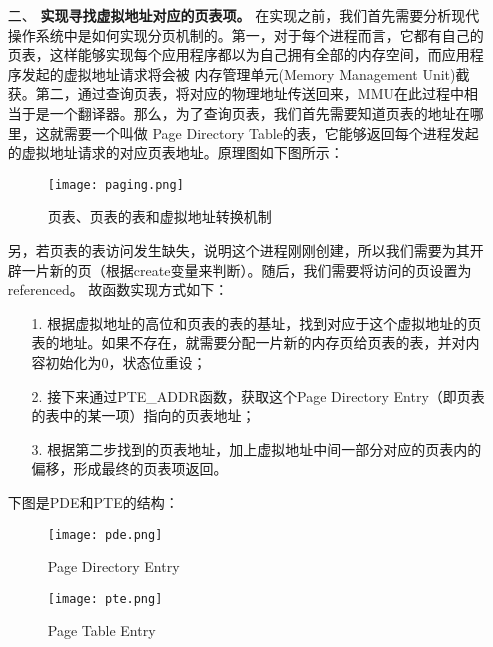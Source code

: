 \documentclass[UTF8, a4paper]{ctexart}
\begin{document}
\begin{enumerate}
    \item [二、] \textbf{实现寻找虚拟地址对应的页表项。}
    在实现之前，我们首先需要分析现代操作系统中是如何实现分页机制的。第一，对于每个进程而言，它都有自己的页表，这样能够实现每个应用程序都以为自己拥有全部的内存空间，而应用程序发起的虚拟地址请求将会被
    内存管理单元(Memory Management Unit)截获。第二，通过查询页表，将对应的物理地址传送回来，MMU在此过程中相当于是一个翻译器。那么，为了查询页表，我们首先需要知道页表的地址在哪里，这就需要一个叫做
    Page Directory Table的表，它能够返回每个进程发起的虚拟地址请求的对应页表地址。原理图如下图所示：
    \begin{figure}[!htb]
        \centering
        \texttt{[image: paging.png]}
        \label{fig:1}
        \caption{页表、页表的表和虚拟地址转换机制}
    \end{figure}
    \par
    另，若页表的表访问发生缺失，说明这个进程刚刚创建，所以我们需要为其开辟一片新的页（根据create变量来判断）。随后，我们需要将访问的页设置为referenced。
    故函数实现方式如下：
    \begin{enumerate}
        \item [1.] 根据虚拟地址的高位和页表的表的基址，找到对应于这个虚拟地址的页表的地址。如果不存在，就需要分配一片新的内存页给页表的表，并对内容初始化为0，状态位重设；
        \item [2.] 接下来通过PTE\_ADDR函数，获取这个Page Directory Entry（即页表的表中的某一项）指向的页表地址；
        \item [3.] 根据第二步找到的页表地址，加上虚拟地址中间一部分对应的页表内的偏移，形成最终的页表项返回。
    \end{enumerate}
    \par
    下图是PDE和PTE的结构：
    \begin{figure}[!htb]
        \centering
        \texttt{[image: pde.png]}
        \label{fig:1}
        \caption{Page Directory Entry}
    \end{figure}
    \begin{figure}[!htb]
        \centering
        \texttt{[image: pte.png]}
        \label{fig:1}
        \caption{Page Table Entry}
    \end{figure}
    \end{enumerate}
\end{document}
